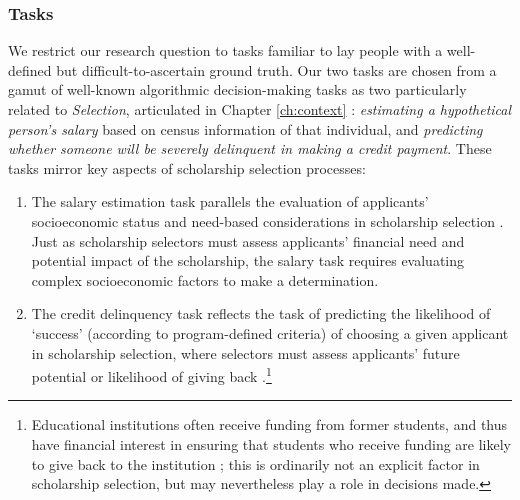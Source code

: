 
\subsubsection{Tasks}\label{ssec:tasks}
We restrict our research question to tasks familiar to lay people with a well-defined but difficult-to-ascertain ground truth. Our two tasks are chosen from a gamut of well-known algorithmic decision-making tasks as two particularly related to \emph{Selection}, articulated in Chapter \ref{ch:context} \cite{10.1111/j.1467-954X.2007.00740.x,Pasquale_2006,Latzer_Hollnbuchner_Just_Saurwein_2014}: \emph{estimating a hypothetical person's salary} based on census information of that individual, and \emph{predicting whether someone will be severely delinquent in making a credit payment}. These tasks mirror key aspects of scholarship selection processes:

\begin{enumerate}
    \item The salary estimation task parallels the evaluation of applicants' socioeconomic status and need-based considerations in scholarship selection \cite{Warikoo_2019}. Just as scholarship selectors must assess applicants' financial need and potential impact of the scholarship, the salary task requires evaluating complex socioeconomic factors to make a determination.
    \item The credit delinquency task reflects the task of predicting the likelihood of `success' (according to program-defined criteria) of choosing a given applicant in scholarship selection, where selectors must assess applicants' future potential or likelihood of giving back \cite{schumann2017diverse}.\footnote{Educational institutions often receive funding from former students, and thus have financial interest in ensuring that students who receive funding are likely to give back to the institution \cite{citation_needed}; this is ordinarily not an explicit factor in scholarship selection, but may nevertheless play a role in decisions made.}
\end{enumerate}


